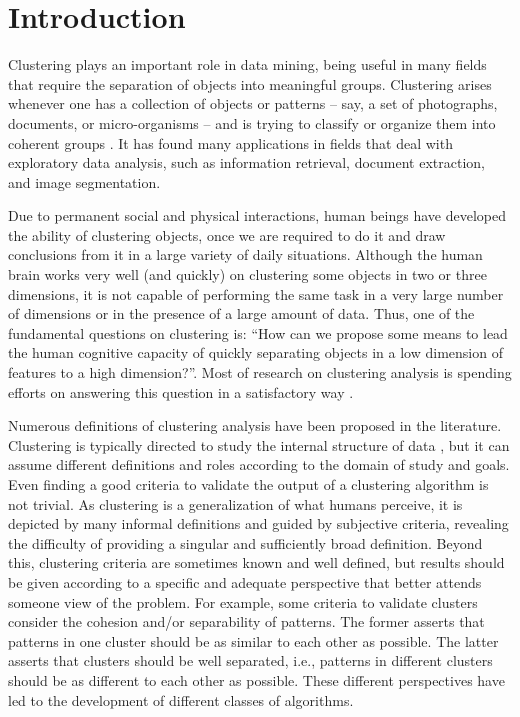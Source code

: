\chapter{Introduction}
Clustering plays an important role in data mining, being useful in many fields that require the separation of objects into meaningful groups. Clustering arises whenever one has a collection of objects or patterns -- say, a set of photographs, documents, or micro-organisms -- and is trying to classify or organize them into coherent groups \cite{tardos}. It has found many applications in fields that deal with exploratory data analysis, such as information retrieval, document extraction, and image segmentation.

Due to permanent social and physical interactions, human beings have developed the ability of clustering objects, once we are required to do it and draw conclusions from it in a large variety of daily situations. Although the human brain works very well (and quickly) on clustering some objects in two or three dimensions, it is not capable of performing the same task in a very large number of dimensions or in the presence of a large amount of data. Thus, one of the fundamental questions on clustering is: ``How can we propose some means to lead the human cognitive capacity of quickly separating objects in a low dimension of features to a high dimension?''. Most of research on clustering analysis is spending efforts on answering this question in a satisfactory way \cite{Das2009}.

Numerous definitions of clustering analysis have been proposed in the literature. Clustering is typically directed to study the internal structure of data \cite{Karkkainen2006}, but it can assume different definitions and roles according to the domain of study and goals. Even finding a good criteria to validate the output of a clustering algorithm is not trivial. As clustering is a generalization of what humans perceive, it is depicted by many informal definitions and guided by subjective criteria, revealing the difficulty of providing a singular and sufficiently broad definition. Beyond this, clustering criteria are sometimes known and well defined, but results should be given according to a specific and adequate perspective that better attends someone view of the problem. For example, some criteria to validate clusters consider the cohesion and/or separability of patterns. The former asserts that patterns in one cluster should be as similar to each other as possible. The latter asserts that clusters should be well separated, i.e., patterns in different clusters should be as different to each other as possible. These different perspectives have led to the development of different classes of algorithms.

